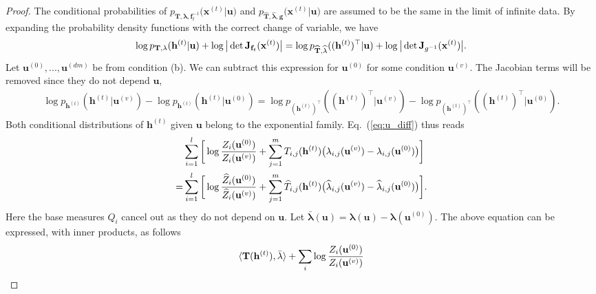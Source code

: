 \documentclass[twoside]{article}
\begin{document}
\begin{proof}
The conditional probabilities of $p_{\mathbf{T}, \mathbf{\lambda}, \mathbf{f}_t^{-1} }\big(\mathbf{x}^{(t)} | \mathbf{u}\big)$ and $p_{\widehat{\mathbf{T}}, \widehat{\mathbf{\lambda}}, \mathbf{g} }\big(\mathbf{x}^{(t)} | \mathbf{u}\big)$ are assumed to be the same in the limit of infinite data.  
By expanding the probability density functions with the correct change of variable, we have 
\begin{align} \notag
\log p_{\mathbf{T}, \mathbf{\lambda}}(\mathbf{h}^{(t)}| \mathbf{u}) + \log \big| \det \mathbf{J}_{\mathbf{f}_t}(\mathbf{x}^{(t)}) \big| = \log p_{\widehat{\mathbf{T}}, \widehat{\mathbf{\lambda}}}((\mathbf{h}^{(t)})^\top| \mathbf{u}) + \log \big| \det \mathbf{J}_{g^{-1}}(\mathbf{x}^{(t)}) \big|.
\end{align}
 Let $\mathbf{u}^{(0)},...,\mathbf{u}^{(dm)}$ be from condition (b). We can subtract this expression for $\mathbf{u}^{(0)}$ for some condition $\mathbf{u}^{(v)}$. The Jacobian terms will be removed since they do not depend  $\mathbf{u}$,
\begin{align} \label{eq:u_diff}
\log p_{\mathbf{h}^{(t)}}(\mathbf{h}^{(t)}|\mathbf{u}^{(v)}) - \log p_{\mathbf{h}^{(t)}}(\mathbf{h}^{(t)}|\mathbf{u}^{(0)}) =\log p_{(\mathbf{h}^{(t)})^\top}((\mathbf{h}^{(t)})^\top|\mathbf{u}^{(v)}) - \log p_{(\mathbf{h}^{(t)})^\top}((\mathbf{h}^{(t)})^\top|\mathbf{u}^{(0)}).
\end{align}
Both conditional distributions of $\mathbf{h}^{(t)}$ given $\mathbf{u}$ belong to the exponential family. 
Eq.~(\ref{eq:u_diff}) thus reads
\begin{align} \notag
&\sum_{i=1}^l \bigg[\log \frac{Z_i(\mathbf{u}^{(0)})}{Z_i(\mathbf{u}^{(v)})} + \sum_{j=1}^m T_{i,j}(\mathbf{h}^{(t)})\big(\lambda_{i,j}(\mathbf{u}^{(v)})- \lambda_{i,j}(\mathbf{u}^{(0)})\big) \bigg] \\
= & \sum_{i=1}^l \bigg[\log \frac{\widehat{Z}_i(\mathbf{u}^{(0)})}{\widehat{Z}_i(\mathbf{u}^{(v)})} + \sum_{j=1}^m \widehat{T}_{i,j}(\mathbf{h}^{(t)})\big(\widehat{\lambda}_{i,j}(\mathbf{u}^{(v)})- \widehat{\lambda}_{i,j}(\mathbf{u}^{(0)})\big) \bigg].
\end{align}
Here the base measures $Q_i$ cancel out as they do not depend on $\mathbf{u}$. 
Let $\bar{\mathbf{\lambda}}(\mathbf{u}) = \mathbf{\lambda}(\mathbf{u})-\mathbf{\lambda}(\mathbf{u}^{(0)})$. 
The above equation can be expressed, with inner products, as follows
\begin{align} \notag
\langle \mathbf{T}(\mathbf{h}^{(t)}), \bar{\mathbf{\lambda}}	\rangle + \sum_i \log \frac{Z_i(\mathbf{u}^{(0)})}{Z_i(\mathbf{u}^{(v)})}

\end{align}
\end{proof}
\end{document}
